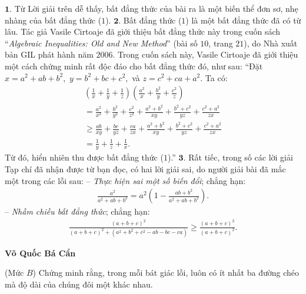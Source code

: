 \begin{multicols}{2}
	\vskip 0.05cm
	$\pmb{1.}$ Từ Lời giải trên dễ thấy, bất đẳng thức của bài ra là một biến thể đơn sơ, nhẹ nhàng của bất đẳng thức ($1$).
	\vskip 0.05cm
	$\pmb{2.}$ Bất đẳng thức ($1$) là một bất đẳng thức đã có từ lâu. Tác giả Vasile Cirtoaje đã giới thiệu bất đẳng thức này trong cuốn sách “\textit{Algebraic Inequalities: Old and New Method}” (bài số $10$, trang $21$), do Nhà xuất bản GIL phát hành năm $2006$. Trong cuốn sách này, Vasile Cirtoaje đã giới thiệu một cách chứng minh rất độc đáo cho bất đẳng thức đó, như sau:
	\vskip 0.05cm
	“Đặt $x = {a^2} + ab + {b^2},$ $y = {b^2} + bc + {c^2},$      và $z = {c^2} + ca + {a^2}$.  Ta có:
	\begin{align*}
			\left( {\frac{1}{x} + \frac{1}{y} + \frac{1}{z}} \right)\left( {\frac{{{a^2}}}{x} + \frac{{{b^2}}}{y} + \frac{{{c^2}}}{z}} \right)\\
			= \frac{{{a^2}}}{{{x^2}}} + \frac{{{b^2}}}{{{y^2}}} + \frac{{{c^2}}}{{{z^2}}} + \frac{{{a^2} + {b^2}}}{{xy}} + \frac{{{b^2} + {c^2}}}{{yz}} + \frac{{{c^2} + {a^2}}}{{zx}}\\
			\ge \frac{{ab}}{{xy}} + \frac{{bc}}{{yz}} + \frac{{ca}}{{zx}} + \frac{{{a^2} + {b^2}}}{{xy}} + \frac{{{b^2} + {c^2}}}{{yz}} + \frac{{{c^2} + {a^2}}}{{zx}}\\
			= \frac{1}{y} + \frac{1}{z} + \frac{1}{x}.
	\end{align*}
	Từ đó, hiển nhiên thu được bất đẳng thức ($1$).”
	\vskip 0.05cm
	$\pmb{3.}$ Rất tiếc, trong số các lời giải Tạp chí đã nhận được từ bạn đọc, có hai lời giải sai, do người giải bài đã mắc một trong các lỗi sau:
	\vskip 0.05cm
	-- \textit{Thực hiện sai một số biến đổi}; chẳng hạn:
	\begin{align*}
		\frac{{{a^2}}}{{{a^2} + ab + {b^2}}} = {a^2}\left( {1 - \frac{{ab + {b^2}}}{{{a^2} + ab + {b^2}}}} \right).
	\end{align*}
	-- \textit{Nhầm chiều bất đẳng thức}; chẳng hạn:
	\begin{align*}
		\frac{{{{\left( {a + b + c} \right)}^2}}}{{{{\left( {a + b + c} \right)}^2} + \left( {{a^2} + {b^2} + {c^2} - ab - bc - ca} \right)}} \ge \frac{{{{\left( {a + b + c} \right)}^2}}}{{{{\left( {a + b + c} \right)}^2}}}.
	\end{align*}
	\begin{flushright}
		\textbf{\color{thachthuctoanhoc}Võ Quốc Bá Cẩn}
	\end{flushright}
	{}
	(Mức $B$)
	Chứng minh rằng, trong mỗi bát giác lồi, luôn có ít nhất ba đường chéo mà độ dài của chúng đôi một khác nhau.

\end{multicols}

